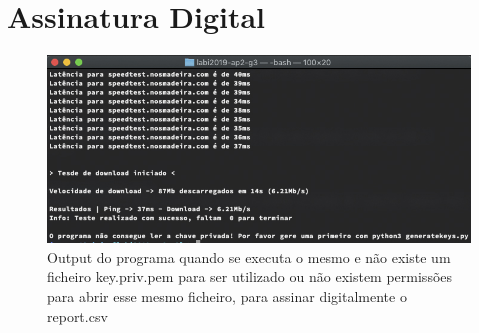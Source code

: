 \documentclass{report}
\begin{document}
\newpage
\section{Assinatura Digital}
\begin{figure}[h!]
    \includegraphics[width=\linewidth]{ss7.jpg}
    \caption{Output do programa quando se executa o mesmo e não existe um ficheiro key.priv.pem para ser utilizado ou não existem permissões para abrir esse mesmo ficheiro, para assinar digitalmente o report.csv }
    \label{fig:noconnection}
\end{figure}
\end{document}
